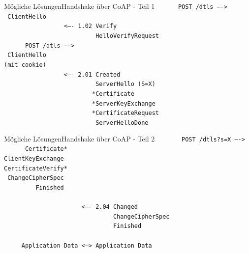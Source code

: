 \documentclass{beamer}
\begin{document}
\begin{frame}{Mögliche Lösungen}{Handshake über CoAP - Teil 1}
  \tt ~~~~~~POST /dtls ---->\\
  \tt ~ClientHello\\
  \tt ~~~~~~~~~~~~~~~~~<---- 1.02 Verify\\
  \tt ~~~~~~~~~~~~~~~~~~~~~~~~~~HelloVerifyRequest\\
  \tt ~~~~~~POST /dtls ---->\\
  \tt ~ClientHello\\
  \tt (mit cookie)\\
  \tt ~~~~~~~~~~~~~~~~~<---- 2.01 Created\\
  \tt ~~~~~~~~~~~~~~~~~~~~~~~~~~ServerHello (S=X)\\
  \tt ~~~~~~~~~~~~~~~~~~~~~~~~~*Certificate\\
  \tt ~~~~~~~~~~~~~~~~~~~~~~~~~*ServerKeyExchange\\
  \tt ~~~~~~~~~~~~~~~~~~~~~~~~~*CertificateRequest\\
  \tt ~~~~~~~~~~~~~~~~~~~~~~~~~~ServerHelloDone
\end{frame}
\begin{frame}{Mögliche Lösungen}{Handshake über CoAP - Teil 2}
  \tt ~~~~~~~POST /dtls?s=X ---->\\
  \tt ~~~~~~Certificate*\\
  \tt ClientKeyExchange\\
  \tt CertificateVerify*\\
  \tt ~ChangeCipherSpec\\
  \tt ~~~~~~~~~Finished\\
  ~\\
  \tt ~~~~~~~~~~~~~~~~~~~~~~<---- 2.04 Changed\\
  \tt ~~~~~~~~~~~~~~~~~~~~~~~~~~~~~~~ChangeCipherSpec\\
  \tt ~~~~~~~~~~~~~~~~~~~~~~~~~~~~~~~Finished\\
  ~\\
  \tt ~~~~~Application Data <---> Application Data
\end{frame}
\end{document}
